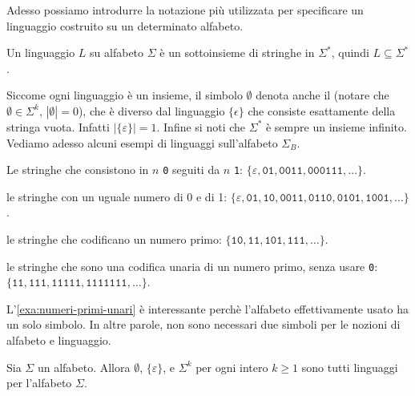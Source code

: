 Adesso possiamo introdurre la notazione più utilizzata per specificare un linguaggio costruito su un determinato alfabeto.


\begin{observation}\label{obs:linguaggio}
Un linguaggio $L$ su alfabeto $\Sigma$ è un sottoinsieme di stringhe in $ \Sigma^*$,
quindi $L\subseteq \Sigma^*$.
\end{observation}

Siccome ogni linguaggio è un insieme, il simbolo $\emptyset$ denota anche il  (notare che
$\emptyset\in\Sigma^k,\,|\emptyset|=0$), che è
diverso dal linguaggio $\{\epsilon\}$ che consiste esattamente della stringa vuota.
Infatti $|\{\varepsilon\}|=1$.
Infine si noti che $\Sigma^*$ è sempre un insieme infinito.
Vediamo adesso alcuni esempi di linguaggi sull'alfabeto $\Sigma_{B}$.


\begin{example}\label{exa:0n01}
Le stringhe che consistono in $n$ \texttt{0} seguiti da $n$ \texttt{1}:
$\{\varepsilon,\mathtt{01},\mathtt{0011},\mathtt{000111},\ldots\}$.
\end{example}

\begin{example}\label{exa:0=1}
le stringhe con un uguale numero di 0 e di 1:
$\{\varepsilon,\mathtt{01},\mathtt{10},\mathtt{0011},\mathtt{0110},\mathtt{0101},\mathtt{1001},\ldots\}$.
\end{example}

\begin{example}\label{exa:numeri-primi-binari}
le stringhe che codificano un numero primo:
$\{\mathtt{10},\mathtt{11},\mathtt{101}, \mathtt{111}, \ldots\}$.
\end{example}

\begin{example}\label{exa:numeri-primi-unari}
le stringhe che sono una codifica unaria di un numero primo, senza usare \texttt{0}:
$\{\mathtt{11},\mathtt{111},\mathtt{11111}, \mathtt{1111111}, \ldots\}$.
\end{example}

L'\cref{exa:numeri-primi-unari} è interessante perchè l'alfabeto effettivamente usato ha un solo simbolo.
In altre parole, non sono necessari due simboli per le nozioni di alfabeto e linguaggio.


\begin{observation}\label{obs:linguaggi-banali}
Sia $\Sigma$ un alfabeto.
Allora $\emptyset$, $\{\varepsilon\}$, e $\Sigma^{k}$ per ogni intero $k\ge 1$ sono tutti linguaggi per l'alfabeto $\Sigma$.
\end{observation}

